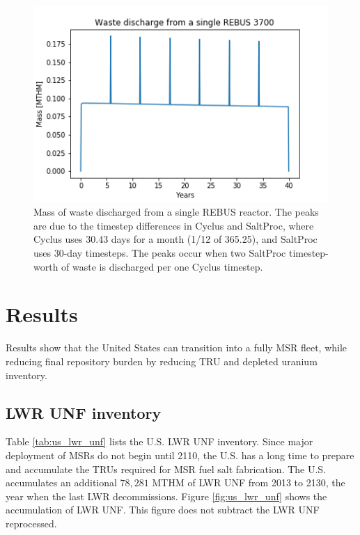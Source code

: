 \begin{figure}[htbp!]
	\begin{center}
		\includegraphics[scale=0.7]{./images/us/rebus_waste.png}
	\end{center}
	\caption{Mass of waste discharged from a single REBUS reactor. The peaks
		are due to the timestep differences in Cyclus and SaltProc, where Cyclus
		uses 30.43 days for a month (1/12 of 365.25), and SaltProc uses 30-day
		timesteps. The peaks occur when two SaltProc timestep-worth of waste is discharged
		per one Cyclus timestep.
	}
	\label{fig:rebus_waste}
\end{figure}


\FloatBarrier


\section{Results}
Results show that the United States can transition into a
fully \gls{MSR} fleet, while reducing final repository
burden by reducing \gls{TRU} and depleted uranium
inventory.

\subsection{\gls{LWR} \gls{UNF} inventory}

Table \ref{tab:us_lwr_unf} lists the U.S. \gls{LWR} \gls{UNF} inventory.
Since major deployment of \glspl{MSR} do not begin until 2110,
the U.S. has a long time to prepare and accumulate the \glspl{TRU}
required for \gls{MSR} fuel salt fabrication. The U.S. accumulates
an additional $78,281$ \gls{MTHM} of \gls{LWR} \gls{UNF}
from 2013 to 2130, the year when the last \gls{LWR} decommissions.
Figure \ref{fig:us_lwr_unf} shows the accumulation of \gls{LWR} \gls{UNF}.
This figure does not subtract the \gls{LWR} \gls{UNF} reprocessed.


